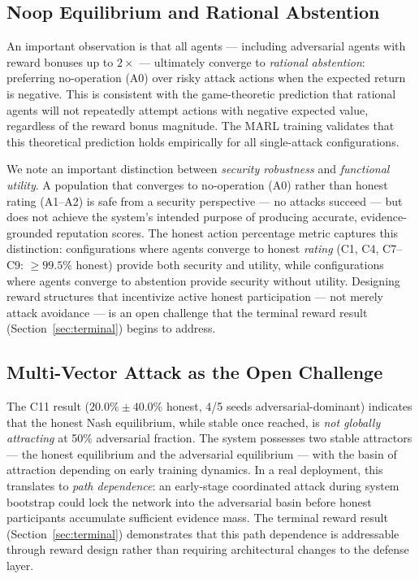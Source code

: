 \subsection{Noop Equilibrium and Rational Abstention}

An important observation is that all agents — including adversarial agents
with reward bonuses up to $2\times$ — ultimately converge to \emph{rational
abstention}: preferring no-operation (A0) over risky attack actions when
the expected return is negative.  This is consistent with the game-theoretic
prediction that rational agents will not repeatedly attempt actions with
negative expected value, regardless of the reward bonus magnitude.  The
MARL training validates that this theoretical prediction holds empirically
for all single-attack configurations.

We note an important distinction between \emph{security robustness} and
\emph{functional utility}.  A population that converges to no-operation
(A0) rather than honest rating (A1--A2) is safe from a security perspective ---
no attacks succeed --- but does not achieve the system's intended purpose of
producing accurate, evidence-grounded reputation scores.  The honest action
percentage metric captures this distinction: configurations where agents
converge to honest \emph{rating} (C1, C4, C7--C9: $\geq\!99.5\%$ honest)
provide both security and utility, while configurations where agents converge
to abstention provide security without utility.  Designing reward structures
that incentivize active honest participation --- not merely attack avoidance ---
is an open challenge that the terminal reward result (Section~\ref{sec:terminal})
begins to address.

\subsection{Multi-Vector Attack as the Open Challenge}

The C11 result ($20.0\% \pm 40.0\%$ honest, 4/5 seeds adversarial-dominant)
indicates that the honest Nash equilibrium, while stable once reached, is
\emph{not globally attracting} at 50\% adversarial fraction.  The system
possesses two stable attractors --- the honest equilibrium and the adversarial
equilibrium --- with the basin of attraction depending on early training
dynamics.  In a real deployment, this translates to \emph{path dependence}:
an early-stage coordinated attack during system bootstrap could lock the
network into the adversarial basin before honest participants accumulate
sufficient evidence mass.  The terminal reward result
(Section~\ref{sec:terminal}) demonstrates that this path dependence is
addressable through reward design rather than requiring architectural changes
to the defense layer.

